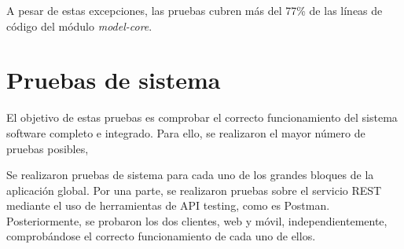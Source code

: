 A pesar de estas excepciones, las pruebas cubren más del 77\% de las líneas de código del módulo \textit{model-core}.


\section{Pruebas de sistema}
El objetivo de estas pruebas es comprobar el correcto funcionamiento del sistema software completo e integrado. Para ello, se realizaron el mayor número de pruebas posibles, 

Se realizaron pruebas de sistema para cada uno de los grandes bloques de la aplicación global. Por una parte, se realizaron pruebas sobre el servicio REST mediante el uso de herramientas de API testing, como  es Postman. Posteriormente, se probaron los dos clientes, web y móvil, independientemente, comprobándose el correcto funcionamiento de cada uno de ellos.


